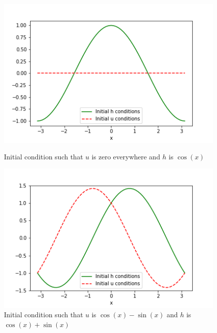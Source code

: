 \documentclass[a4paper,12pt, notitlepage]{article}
\begin{document}
\begin{figure}
\begin{minipage}{.5\textwidth}
	\end{minipage}
	\begin{minipage}{.5\textwidth}
			\ContinuedFloat
			\captionsetup{width=0.9\textwidth}
			\captionsetup{justification=centering}
			\includegraphics[width=\textwidth]{initial_condition_cos.png}
			\caption{\label{initialconditioncos}Initial condition such that $u$ is zero everywhere and $h$ is $\cos(x)$}
		\end{minipage}
		\begin{minipage}{.5\textwidth}
		\ContinuedFloat
		\captionsetup{width=0.9\textwidth}
		\captionsetup{justification=centering}
		\includegraphics[width=\textwidth]{initial_condition_cossin.png}
		\caption{\label{initialconditioncossin}Initial condition such that $u$ is $\cos(x) - \sin(x)$ and $h$ is $\cos(x) + \sin(x)$}
	\end{minipage}
\end{figure}
\end{document}
